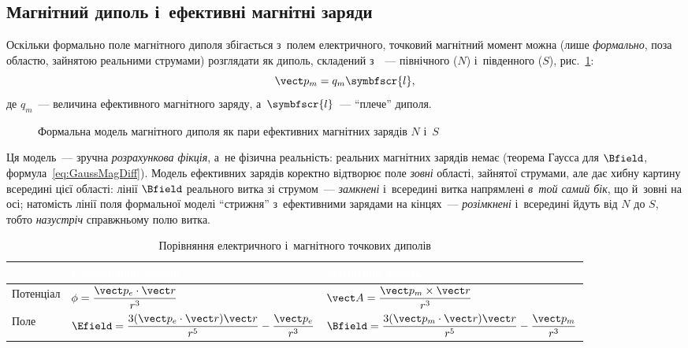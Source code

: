 \subsection*{Магнітний диполь і~ефективні магнітні заряди}


Оскільки формально поле магнітного диполя збігається з~полем електричного, точковий
магнітний момент можна (лише \emph{формально}, поза областю, зайнятою реальними струмами)
розглядати як диполь, складений з~~--- північного
($N$) і~південного ($S$), рис.~\ref{pic:DipoleCharges}:
\begin{equation*}
	\vect p_m = q_m\symbfscr{l},
\end{equation*}
де $q_m$~--- величина ефективного магнітного заряду, а~$\symbfscr{l}$~--- \enquote{плече}
диполя.

\begin{figure}\centering
	\caption{Формальна модель магнітного диполя як пари ефективних магнітних зарядів $N$
		і~$S$\label{pic:DipoleCharges}}
\end{figure}

\begin{Attention}
	Ця модель~--- зручна \emph{розрахункова фікція}, а~не фізична реальність: реальних
	магнітних зарядів немає (теорема Гаусса для $\Bfield$,
	формула~\eqref{eq:GaussMagDiff}). Модель ефективних зарядів коректно відтворює поле
	\emph{зовні} області, зайнятої струмами, але дає хибну картину всередині цієї
	області: лінії $\Bfield$ реального витка зі струмом~--- \emph{замкнені} і~всередині
	витка напрямлені \emph{в~той самий бік}, що й~зовні на осі; натомість лінії поля
	формальної моделі \enquote{стрижня} з~ефективними зарядами на кінцях~---
	\emph{розімкнені} і~всередині йдуть від $N$ до $S$, тобто \emph{назустріч}
	справжньому полю витка.
\end{Attention}

\begin{table}[h!]\small\centering
	\caption{Порівняння електричного і~магнітного точкових диполів}
	\begin{tabularx}{\linewidth}{|>{\raggedright\arraybackslash}X|>{\centering\arraybackslash}X|>{\centering\arraybackslash}X|}
\hline
\rowcolor{themecolorlight}\multicolumn{1}{|c|}{} & \textcolor{white}{\textbf{Електричний диполь}} & \textcolor{white}{\textbf{Магнітний диполь}} \\ \hline
Потенціал & $\phi = \dfrac{\vect p_e\cdot\vect r}{r^3}$ & $\vect A = \dfrac{\vect p_m\times\vect r}{r^3}$ \\ \hline
\rowcolor{gray!10}Поле & $\Efield = \dfrac{3(\vect p_e\cdot\vect r)\vect r}{r^5} - \dfrac{\vect p_e}{r^3}$ & $\Bfield = \dfrac{3(\vect p_m\cdot\vect r)\vect r}{r^5} - \dfrac{\vect p_m}{r^3}$ \\ \hline
\end{tabularx}
\end{table}


